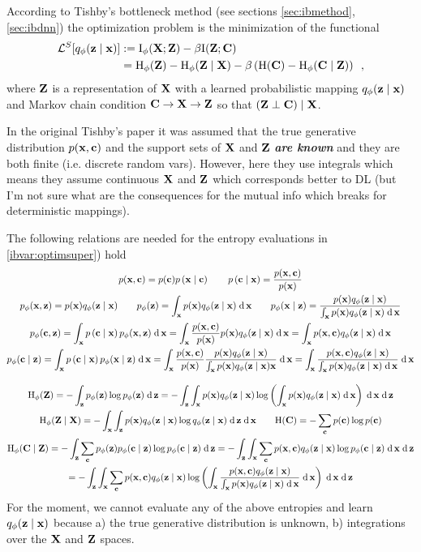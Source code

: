 According to Tishby's bottleneck method \parencite{tishbyInformationBottleneckMethod2000, tishbyDeepLearningInformation2015} (see sections \ref{sec:ibmethod}, \ref{sec:ibdnn}) the optimization problem is the minimization of the functional 
\begin{align}\label{ibvar:optimsuper}
\mL^{S}[\qfz] 
& := \rI_{\phi}(\bX; \bZ) - \beta \rI(\bZ; \bC) \nn
& = \rH_\phi(\bZ) - \rH_\phi(\bZ \mid \bX) - \beta \left( \rH(\bC) - \rH_\phi(\bC \mid \bZ) \right) 
 \enspace ,
\end{align}
where $\bZ$ is a representation of $\bX$ with a learned probabilistic mapping $\qfz$ and Markov chain condition $\bC \to \bX \to \bZ$ so that $(\bZ \perp \bC) \mid \bX$.

In the original Tishby's paper it was assumed that the true generative distribution $p(\bx, \bc)$ and the support sets of $\bX$ and $\bZ$ \textbf{\emph{are known}} and they are both finite (i.e. discrete random vars).
However, here they use integrals which means they assume continuous $\bX$ and $\bZ$ which corresponds better to DL (but I'm not sure what are the consequences for the mutual info which breaks for deterministic mappings).

The following relations are needed for the entropy evaluations in \ref{ibvar:optimsuper}) hold
\begin{gather}
p(\bx, \bc) = p(\bc)\pc{\bx}{\bc} \qquad \pc{\bc}{\bx} = \frac{p(\bx, \bc)}{p(\bx)} \nn
p_\phi(\bx , \bz) = p(\bx) \qfz \qquad p_\phi(\bz) = \int_\bx p(\bx) \qfz \dif \bx \qquad 
p_\phi(\bx \mid \bz) = \frac{p(\bx) \qfz}{\int_\bx p(\bx) \qfz \dif \bx} \nn
p_\phi(\bc , \bz) 
= \int_\bx \pc{\bc}{\bx} p_\phi(\bx, \bz) \dif \bx = \int_\bx \frac{p(\bx, \bc)}{p(\bx)} p(\bx) \qfz \dif \bx 
=  \int_\bx p(\bx, \bc) \qfz \dif \bx \nn
p_\phi(\bc \mid \bz) = \int_\bx \pc{\bc}{\bx} p_\phi(\bx \mid \bz) \dif \bx 
=  \int_\bx  \frac{p(\bx, \bc)}{p(\bx)} \frac{p(\bx) \qfz}{\int_\bx p(\bx) \qfz \bx} \dif \bx
= \int_\bx  \frac{p(\bx, \bc) \qfz}{\int_\bx p(\bx) \qfz \dif \bx} \dif \bx
\nonumber
\end{gather}

\begin{gather}
\rH_\phi(\bZ)  = - \int_\bz p_\phi(\bz) \log p_\phi(\bz) \dif \bz
= - \int_\bz \int_\bx p(\bx) \qfz \log \left( \int_\bx p(\bx) \qfz \dif \bx \right) \dif \bx \dif \bz
\nn
\rH_\phi(\bZ \mid \bX) = - \int_\bx \int_\bz  p(\bx) \qfz \log \qfz \dif \bz \dif \bx 
\qquad 
\rH(\bC) = - \sum_\bc p(\bc) \log p(\bc)
\nn 
\rH_\phi(\bC \mid \bZ)
 = - \int_\bz \sum_\bc p_\phi(\bz) p_\phi(\bc \mid \bz) \log p_\phi(\bc \mid \bz) \dif \bz 
 = - \int_\bz \int_\bx \sum_\bc p(\bx, \bc) \qfz \log p_\phi(\bc \mid \bz) \dif \bx \dif \bz \nn
 = - \int_\bz \int_\bx \sum_\bc p(\bx, \bc) \qfz \log \left( \int_\bx  \frac{p(\bx, \bc) \qfz}{\int_\bx p(\bx) \qfz \dif \bx} \dif \bx \right) \dif \bx \dif \bz \nonumber
\end{gather}
For the moment, we cannot evaluate any of the above entropies and learn $\qfz$ because a) the true generative distribution is unknown, b) integrations over the $\bX$ and $\bZ$ spaces.


